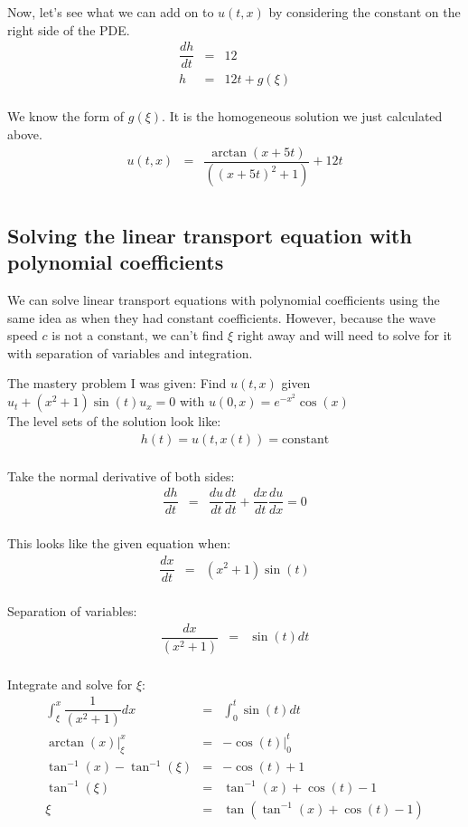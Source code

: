 \documentclass{article}
\newcommand{\bea}{\begin{eqnarray*}}
\newcommand{\eea}{\end{eqnarray*}}
\newcommand{\red}[1]{\textcolor{red}{#1}}
\begin{document}
Now, let's see what we can add on to $u(t,x)$ by considering the constant on the right side of the PDE.\\
\bea
\dfrac{dh}{dt} &=& 12 \\
h &=& 12t + g(\xi) \\ 
\eea

We know the form of $g(\xi)$. It is the homogeneous solution we just calculated above. 
\bea
u(t,x) &=& \dfrac{\arctan(x+5t)}{((x+5t)^2+1)} + 12t \\
\eea


\subsection{Solving the linear transport equation with polynomial coefficients}
We can solve linear transport equations with polynomial coefficients using the same idea as when they had constant coefficients. However, because the wave speed $c$ is not a constant, we can't find $\xi$ right away and will need to solve for it with separation of variables and integration. \newline

The mastery problem I was given: Find $u(t,x)$ given $u_t+(x^2+1)\sin(t)u_x=0$ with $u(0,x) = e^{-x^2}\cos(x)$ \\

The level sets of the solution look like:
\bea
h(t) = u(t,x(t)) = \mbox{constant}\\
\eea

Take the normal derivative of both sides:
\bea
\dfrac{dh}{dt} &=& \dfrac{du}{dt}\dfrac{dt}{dt} + \dfrac{dx}{dt}\dfrac{du}{dx} = 0\\
\eea

This looks like the given equation when:
\bea
\dfrac{dx}{dt} &=& (x^2+1)\sin(t) \\
\eea

Separation of variables:
\bea
\dfrac{dx}{(x^2+1)} &=& \sin(t)dt \\
\eea

Integrate and solve for $\xi$:
\bea
\int_{\xi}^{x} \dfrac{1}{(x^2+1)}dx &=& \int_{0}^{t} \sin(t)dt\\
\arctan(x)\Big|_\xi^x &=& -\cos(t)\Big|_0^t\\
\tan^{-1}(x)-\tan^{-1}(\xi) &=& -\cos(t) + 1\\
\tan^{-1}(\xi) &=& \tan^{-1}(x) + \cos(t) - 1\\
\xi &=& \tan(\tan^{-1}(x) + \cos(t) - 1)\\
\eea 
\end{document}
